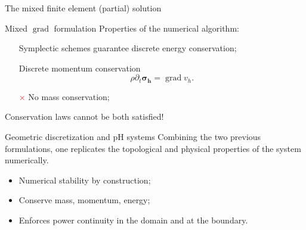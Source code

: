\documentclass[aspectratio=169]{beamer}
\DeclareMathOperator*{\grad}{grad}
\begin{document}
\begin{frame}{The mixed finite element (partial) solution}
\begin{overlayarea}{\textwidth}{\textheight}
{\begin{block}{Mixed $\grad$ formulation}
					Properties of the numerical algorithm:
					\begin{itemize}
						\item[\textcolor{green}{\checkmark}] Symplectic schemes guarantee discrete energy conservation;
						\item[\textcolor{green}{\checkmark}] Discrete momentum conservation
						\begin{equation*}
							\rho \partial_t \bm{\sigma_h} = \grad v_h .
						\end{equation*}
						\item[\textcolor{red}{$\times$}] No mass conservation;
					\end{itemize}
				\end{block}
				
				\Large{Conservation laws cannot be both satisfied!}
			}
			
			
		\end{overlayarea}
	\end{frame}
	
	
	\begin{frame}{Geometric discretization and pH systems}
		Combining the two previous formulations, one replicates the topological and physical properties of the system numerically.
	
			\begin{tcolorbox}
				\begin{itemize}
					\item Numerical stability by construction;
					\item Conserve mass, momentum, energy;
					\item Enforces power continuity in the domain and at the boundary.
				\end{itemize}
			\end{tcolorbox}
		
	\end{frame}
	
	
\end{document}
